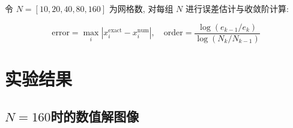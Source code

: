 \documentclass[11pt]{article}
\begin{document}
令 $N = [10, 20, 40, 80, 160]$ 为网格数, 对每组 $N$ 进行误差估计与收敛阶计算:

\begin{equation*}
\text{error} = \max_i |x_i^{\text{exact}} - x_i^{\text{num}}|,\quad
\text{order} = \frac{\log(e_{k-1}/e_k)}{\log(N_k/N_{k-1})}
\end{equation*}

\section{实验结果}
\subsection{\texorpdfstring{$N=160$时的数值解图像}{N=160时的数值解图像}}
\end{document}
